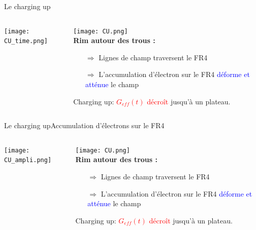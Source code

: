     \begin{frame}{Le charging up}
        \begin{scriptsize}
            \begin{columns}
       			\begin{column}{0.5\textwidth}
           			\texttt{[image: CU\_time.png]}
       			\end{column}\hfill
       			\begin{column}{0.5\textwidth}
       				\texttt{[image: CU.png]}\\\vspace{1cm}
           			\textbf{Rim autour des trous :}
       				\begin{itemize}
       					\item[$\Rightarrow$] Lignes de champ traversent le FR4\\
       					\item[$\Rightarrow$] L'accumulation d'électron sur le FR4 \textcolor{blue}{déforme et atténue} le champ
       				\end{itemize}
       				Charging up: \textcolor{red}{$G_{eff}(t)$ décroît} jusqu'à un plateau.
           		\end{column}
           	\end{columns}
        \end{scriptsize}
    \end{frame}
        
        \begin{frame}{Le charging up}{Accumulation d'électrons sur le FR4}
            \begin{scriptsize}
                \begin{columns}
           			\begin{column}{0.5\textwidth}
               			\texttt{[image: CU\_ampli.png]}
           			\end{column}\hfill
           			\begin{column}{0.5\textwidth}
           				\texttt{[image: CU.png]}\\\vspace{1cm}
               			\textbf{Rim autour des trous :}
           				\begin{itemize}
           					\item[$\Rightarrow$] Lignes de champ traversent le FR4\\
           					\item[$\Rightarrow$] L'accumulation d'électron sur le FR4 \textcolor{blue}{déforme et atténue} le champ
           				\end{itemize}
           				Charging up: \textcolor{red}{$G_{eff}(t)$ décroît} jusqu'à un plateau.
               		\end{column}
               	\end{columns}
            \end{scriptsize}
        \end{frame}

